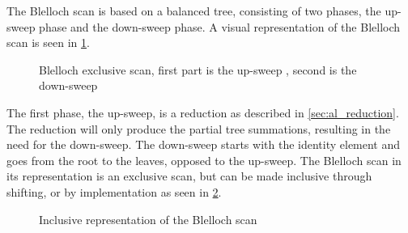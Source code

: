The Blelloch scan \cite{BlellochTR90} is based on a balanced tree, consisting of two phases, the up-sweep phase and the down-sweep phase. A visual representation of the Blelloch scan is seen in \cref{fig:scan_blelloch}. 

\begin{figure}[ht]
	\centering
	\caption{Blelloch exclusive scan, first part is the up-sweep , second is the down-sweep}
	\label{fig:scan_blelloch}
\end{figure}

The first phase, the up-sweep, is a reduction as described in \cref{sec:al_reduction}. The reduction will only produce the partial tree summations, resulting in the need for the down-sweep. The down-sweep starts with the identity element and goes from the root to the leaves, opposed to the up-sweep. The Blelloch scan in its representation is an exclusive scan, but can be made inclusive through shifting, or by implementation as seen in \cref{fig:scan_inclusive}.

\begin{figure}[ht]
	\centering
	\caption{Inclusive representation of the Blelloch scan}
	\label{fig:scan_inclusive}
\end{figure}

